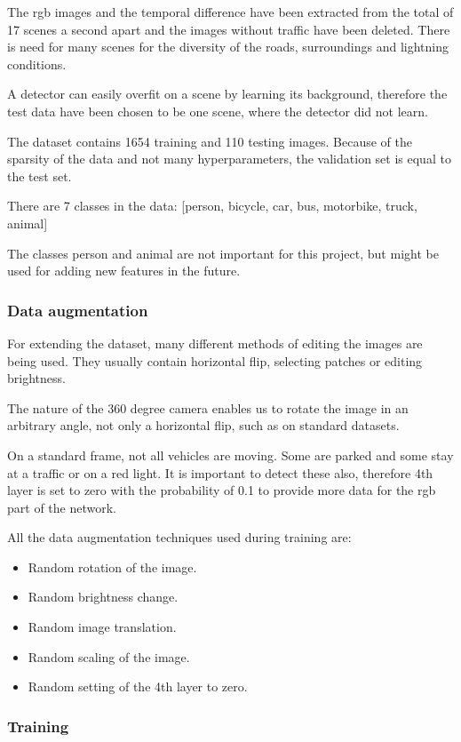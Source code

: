\documentclass[a4paper,12pt,titlepage, twoside]{article}
\numberwithin{figure}{section}
\begin{document}
The rgb images and the temporal difference have been extracted from the total of 17 scenes a second apart and the images without traffic have been deleted. There is need for many scenes for the diversity of the roads, surroundings and lightning conditions. 

A detector can easily overfit on a scene by learning its background, therefore the test data have been chosen to be one scene, where the detector did not learn.

The dataset contains 1654 training and 110 testing images. Because of the sparsity of the data and not many hyperparameters, the validation set is equal to the test set.

There are 7 classes in the data: 
[person, bicycle, car, bus, motorbike, truck, animal]

The classes person and animal are not important for this project, but might be used for adding new features in the future.
\subsubsection{Data augmentation}
For extending the dataset, many different methods of editing the images are being used. They usually contain horizontal flip, selecting patches or editing brightness. 

The nature of the 360 degree camera enables us to rotate the image in an arbitrary angle, not only a horizontal flip, such as on standard datasets. 

On a standard frame, not all vehicles are moving. Some are parked and some stay at a traffic or on a red light. It is important to detect these also, therefore 4th layer is set to zero with the probability of 0.1 to provide more data for the rgb part of the network.

All the data augmentation techniques used during training are:

\begin{itemize}
\item Random rotation of the image.
\item Random brightness change.
\item Random image translation.
\item Random scaling of the image.
\item Random setting of the 4th layer to zero.
\end{itemize}

\subsubsection{Training}
\end{document}
